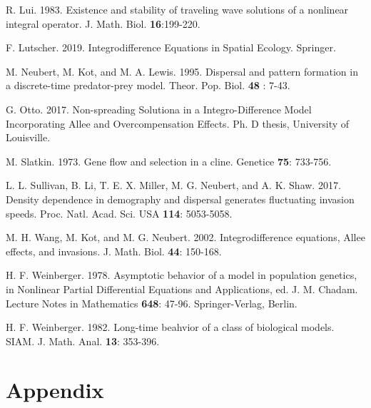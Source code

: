 \documentclass[11pt]{article}
\theoremstyle{definition}
\numberwithin{equation}{section}
\numberwithin{thm}{section}
\begin{document}
\begin{thebibliography}{9}
 R. Lui. 1983. Existence and stability of traveling wave solutions of a nonlinear
integral operator. J. Math. Biol. {\bf 16}:199-220.

F. Lutscher. 2019. Integrodifference Equations in Spatial Ecology.  Springer.


 M. Neubert, M. Kot, and M. A. Lewis. 1995. Dispersal and pattern formation in a
discrete-time predator-prey model. Theor. Pop. Biol. {\bf 48}
: 7-43.

 G. Otto. 2017. Non-spreading Solutiona in a Integro-Difference Model Incorporating Allee and Overcompensation Effects. Ph. D thesis, University of Louisville.

 M. Slatkin. 1973. Gene flow and selection in a cline.
Genetice {\bf 75}: 733-756.



 L. L. Sullivan, B. Li, T. E. X. Miller, M. G. Neubert, and A. K. Shaw. 2017.
Density dependence in demography and dispersal generates fluctuating invasion speeds. Proc. Natl. Acad. Sci. USA {\bf
114}: 5053-5058.


 M. H. Wang, M. Kot, and M. G. Neubert. 2002. Integrodifference equations, Allee effects, and
invasions. J. Math. Biol. {\bf 44}: 150-168.

 H. F. Weinberger. 1978. Asymptotic behavior of a model in  population genetics,
in Nonlinear Partial Differential Equations  and Applications, ed.
J. M. Chadam. Lecture Notes in Mathematics {\bf 648}: 47-96.
Springer-Verlag, Berlin.

 H. F.  Weinberger. 1982. Long-time beahvior of a class of biological models. SIAM. J.
Math. Anal. {\bf 13}: 353-396.

\end{thebibliography}


\appendix

\section{Appendix}
\end{document}
